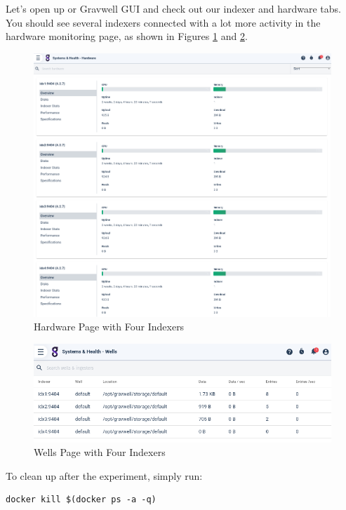 Let's open up or Gravwell GUI and check out our indexer and hardware
tabs. You should see several indexers connected with a lot more
activity in the hardware monitoring page, as shown in Figures \ref{fig:idx-hardware} and \ref{fig:idx-wells}.

\begin{figure}
	\includegraphics{images/hardware.png}
	\caption{Hardware Page with Four Indexers}
	\label{fig:idx-hardware}
\end{figure}

\begin{figure}
	\includegraphics{images/docker-wells.png}
	\caption{Wells Page with Four Indexers}
	\label{fig:idx-wells}
\end{figure}

To clean up after the experiment, simply run:

\begin{Verbatim}[breaklines=true]
docker kill $(docker ps -a -q)
\end{Verbatim}
